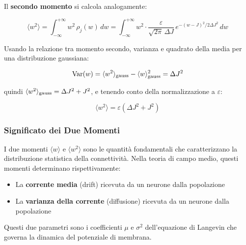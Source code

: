 Il \textbf{secondo momento} si calcola analogamente:

\begin{equation}
\langle w^2 \rangle = \int_{-\infty}^{+\infty} w^2\,\rho_j(w)\,dw = \int_{-\infty}^{+\infty} w^2 \cdot \frac{\varepsilon}{\sqrt{2\pi}\,\Delta J}\,e^{-(w-J)^2/2\Delta J^2}\,dw
\end{equation}

Usando la relazione tra momento secondo, varianza e quadrato della media per una distribuzione gaussiana:

\begin{equation}
\text{Var}(w) = \langle w^2 \rangle_{\rm gauss} - \langle w \rangle_{\rm gauss}^2 = \Delta J^2
\end{equation}

quindi $\langle w^2 \rangle_{\rm gauss} = \Delta J^2 + J^2$, e tenendo conto della normalizzazione a $\varepsilon$:

\begin{equation}
\boxed{\langle w^2 \rangle = \varepsilon\left(\Delta J^2 + J^2\right)}
\end{equation}

\subsubsection{Significato dei Due Momenti}

I due momenti $\langle w \rangle $ e $\langle w^2 \rangle$ sono le quantità fondamentali che caratterizzano la distribuzione statistica della connettività. Nella teoria di campo medio, questi momenti determinano rispettivamente:

\begin{itemize}
    \item La \textbf{corrente media} (drift) ricevuta da un neurone dalla popolazione
    \item La \textbf{varianza della corrente} (diffusione) ricevuta da un neurone dalla popolazione
\end{itemize}

Questi due parametri sono i coefficienti $\mu$ e $\sigma^2$ dell'equazione di Langevin che governa la dinamica del potenziale di membrana.

    
